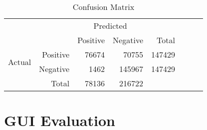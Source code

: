 \begin{table}[tbp]
    \centering
     \begin{tabular}{rrrrrrrr}
      \toprule
      \multicolumn{2}{c}{} & \multicolumn{2}{c}{Predicted} & \\
      \cmidrule{3-4}
      \multicolumn{2}{c}{} & \multicolumn{1}{c}{Positive} & \multicolumn{1}{c}{Negative} & Total \\
      \midrule
      \multirow{2}{*}{Actual} & Positive & \num{76674} & \num{70755}  & \num{147429} \\
                              & Negative & \num{1462}  & \num{145967} & \num{147429} \\ \cmidrule{1-2}
                              & Total    & \num{78136} & \num{216722} \\
      \bottomrule
    \end{tabular}
    \caption[Confusion Matrix]{Confusion Matrix}%
    \label{tab:confusionmatrix}
\end{table}

\section{GUI Evaluation}